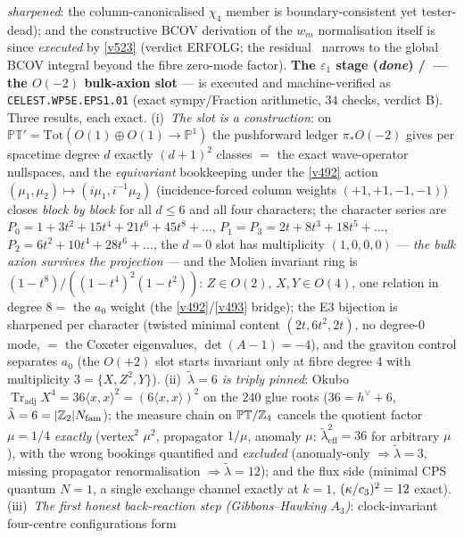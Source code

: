 \emph{sharpened}: the column-canonicalised $\chi_4$ member is boundary-consistent yet
tester-dead); and the constructive BCOV derivation of the $w_m$ normalisation itself is
since \emph{executed} by \vref{v523} (verdict ERFOLG; the residual \mO\ narrows to the
global BCOV integral beyond the fibre zero-mode factor).
\textbf{The $\varepsilon_1$ stage (\emph{done}) \mE/\mC\ --- the $O(-2)$ bulk-axion slot} --- is
executed and machine-verified as \texttt{CELEST.WP5E.EPS1.01}
 (exact sympy/Fraction arithmetic, $34$ checks,
verdict B). Three results, each exact. (i)~\emph{The slot is a construction}: on
$\mathbb{PT}'=\mathrm{Tot}(O(1){\oplus}O(1)\to\mathbb P^1)$ the pushforward ledger
$\pi_*O(-2)$ gives per spacetime degree $d$ exactly $(d{+}1)^2$ classes $=$ the exact
wave-operator nullspaces, and the \emph{equivariant} bookkeeping under the \vref{v492} action
$(\mu_1,\mu_2)\mapsto(i\mu_1,i^{-1}\mu_2)$ (incidence-forced column weights $(+1,+1,-1,-1)$)
closes \emph{block by block} for all $d\le6$ and all four characters; the character series are
$P_0=1+3t^2+15t^4+21t^6+45t^8+\dots$, $P_1=P_3=2t+8t^3+18t^5+\dots$,
$P_2=6t^2+10t^4+28t^6+\dots$, the $d=0$ slot has multiplicity $(1,0,0,0)$ --- \emph{the bulk
axion survives the projection} --- and the Molien invariant ring is
$(1-t^8)/((1-t^4)^2(1-t^2))$: $Z\in O(2)$, $X,Y\in O(4)$, one relation in degree $8=$ the $a_0$
weight (the \vref{v492}/\vref{v493} bridge); the E3 bijection is sharpened per character (twisted
minimal content $(2t,6t^2,2t)$, no degree-$0$ mode, $=$ the Coxeter eigenvalues,
$\det(A-1)=-4$), and the graviton control separates $a_0$ (the $O(+2)$ slot starts invariant only
at fibre degree $4$ with multiplicity $3=\{X,Z^2,Y\}$). (ii)~\emph{$\tilde\lambda=6$ is triply
pinned}: Okubo $\operatorname{Tr}_{\mathrm{adj}}X^4=36\langle x,x\rangle^2
=(6\langle x,x\rangle)^2$ on the $240$ glue roots ($36=h^\vee+6$,
$\tilde\lambda=6=|\mathbb Z_2|N_{\mathrm{fam}}$); the measure chain on $\mathbb{PT}/\mathbb Z_4$ cancels the
quotient factor $\mu=1/4$ \emph{exactly} (vertex$^2$ $\mu^2$, propagator $1/\mu$, anomaly $\mu$:
$\tilde\lambda_{\mathrm{eff}}^2=36$ for arbitrary $\mu$), with the wrong bookings quantified and
\emph{excluded} (anomaly-only $\Rightarrow\tilde\lambda=3$, missing propagator renormalisation
$\Rightarrow\tilde\lambda=12$); and the flux side (minimal CPS quantum $N=1$, a single exchange
channel exactly at $k=1$, $(\kappa/c_3)^2=12$ exact). (iii)~\emph{The first honest
back-reaction step (Gibbons--Hawking $A_3$)}: clock-invariant four-centre configurations form

